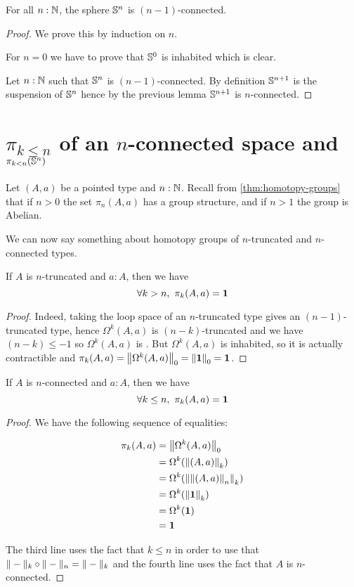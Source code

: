 \begin{cor} \label{cor:sn-connected}
  For all $n:\N$, the sphere $\Sn^n$ is $(n-1)$-connected.
\end{cor}

\begin{proof}
  We prove this by induction on $n$.

  For $n=0$ we have to prove that $\Sn^0$ is inhabited which is clear.

  Let $n:\N$ such that $\Sn^n$ is $(n-1)$-connected. By definition $\Sn^{n+1}$
  is the suspension of $\Sn^n$ hence by the previous lemma $\Sn^{n+1}$ is
  $n$-connected.
\end{proof}

\section{\texorpdfstring{$\pi_{k \le n}$}{π\_(k≤n)} of an \texorpdfstring{$n$}{n}-connected space and \texorpdfstring{$\pi_{k < n}(\Sn ^n)$}{π\_(k<n)(Sⁿ)}}
\label{sec:pik-le-n}

Let $(A,a)$ be a pointed type and $n:\N$.  Recall from
\autoref{thm:homotopy-groups} that if $n>0$ the set $\pi_n(A,a)$ has a group
structure, and if $n>1$ the group is Abelian.

We can now say something about homotopy groups of $n$-truncated and
$n$-connected types.

\begin{lem}
  If $A$ is $n$-truncated and $a:A$, then we have
  \[\forall k>n,\ \pi_k(A,a)=\unit\]
\end{lem}

\begin{proof}
  Indeed, taking the loop space of an $n$-truncated type gives an
  $(n-1)$-truncated type, hence $\Omega^k(A,a)$ is $(n-k)$-truncated and we have
  $(n-k)\le-1$ so $\Omega^k(A,a)$ is \anhprop. But $\Omega^k(A,a)$ is inhabited,
  so it is actually contractible and
  $\pi_k(A,a)=\trunc0{\Omega^k(A,a)}=\trunc0{\unit}=\unit$.
\end{proof}

\begin{lem} \label{lem:pik-nconnected}
  If $A$ is $n$-connected and $a:A$, then we have
  \[\forall k\le{}n,\ \pi_k(A,a)=\unit\]
\end{lem}

\begin{proof}
  We have the following sequence of equalities:

  \begin{align*}
    \pi_k(A,a) &= \trunc0{\Omega^k(A,a)} \\
    &= \Omega^k(\trunc k{(A,a)}) \\
    &= \Omega^k(\trunc k{\trunc n{(A,a)}}) \\
    &= \Omega^k(\trunc k{\unit}) \\
    &= \Omega^k(\unit) \\
    &= \unit
  \end{align*}

  The third line uses the fact that $k\le{}n$ in order to use that
  $\truncf k\circ\truncf n=\truncf k$ and the fourth line uses the fact that $A$ is
  $n$-connected.
\end{proof}

